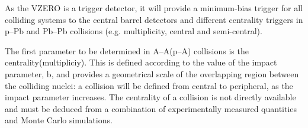 As the VZERO is a trigger detector, it will provide a minimum-bias trigger for all colliding systems to the central barrel detectors and different centrality triggers in p--Pb and Pb--Pb collisions (e.g. multiplicity, central and semi-central).  

The first parameter to be determined in A--A(p--A) collisions is the centrality(multipliciy). This is defined according to the value of the impact parameter, b, and provides a geometrical scale of the overlapping region between the colliding nuclei: a collision will be defined from central to peripheral, as the impact parameter increases. The centrality of a collision is not directly available and must be deduced from a combination of experimentally measured quantities and Monte Carlo simulations.


